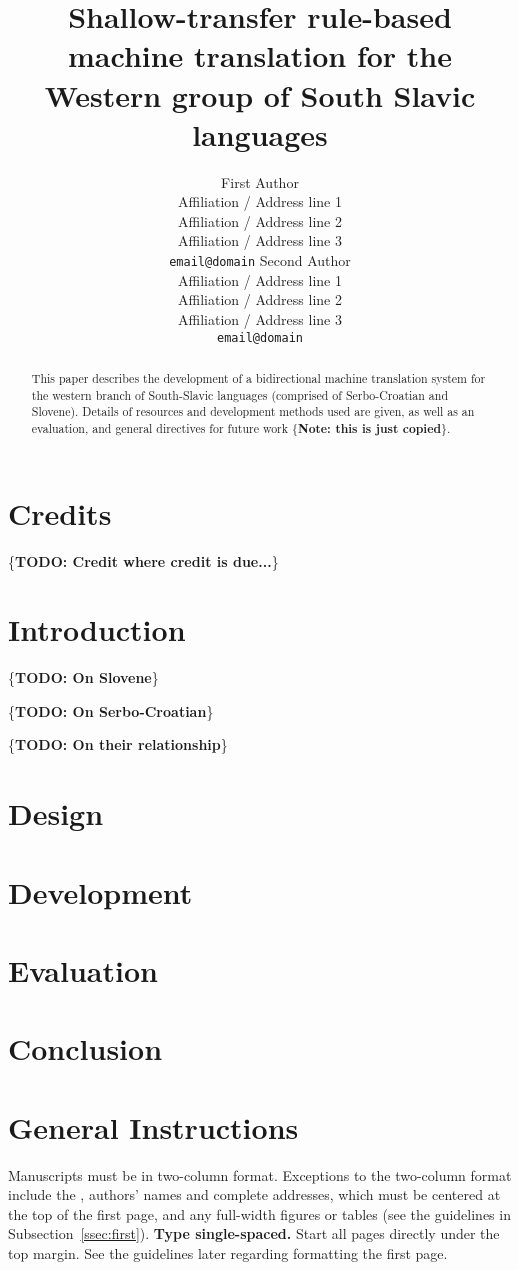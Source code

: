 \documentclass[11pt]{article}
\title{Shallow-transfer rule-based machine translation for the Western group of South Slavic languages}
\author{First Author\\
  Affiliation / Address line 1\\
  Affiliation / Address line 2\\
  Affiliation / Address line 3\\
  {\tt email@domain}  \And
  Second Author\\
  Affiliation / Address line 1\\
  Affiliation / Address line 2\\
  Affiliation / Address line 3\\
  {\tt email@domain}}
\date{}
\newcommand{\todo}[1]{\{\textbf{TODO: #1}\}}
\newcommand{\note}[1]{\{\textbf{Note: #1}\}}
\begin{document}
\maketitle
\begin{abstract}
  This paper describes the development of a bidirectional machine
  translation system for the western branch of South-Slavic languages
  (comprised of Serbo-Croatian and Slovene). Details of resources and
  development methods used are given, as well as an evaluation, and
  general directives for future work \note{this is just copied}.
\end{abstract}

\section{Credits}

\todo{Credit where credit is due...}

\section{Introduction}

\todo{On Slovene}

\todo{On Serbo-Croatian}

\todo{On their relationship}

\section{Design}
\section{Development}
\section{Evaluation}
\section{Conclusion}

\section{General Instructions}

Manuscripts must be in two-column format.  Exceptions to the
two-column format include the {}, authors' names and complete
addresses, which must be centered at the top of the first page, and
any full-width figures or tables (see the guidelines in
Subsection~\ref{ssec:first}). {\bf Type single-spaced.}  Start all
pages directly under the top margin. See the guidelines later
regarding formatting the first page.
\end{document}
